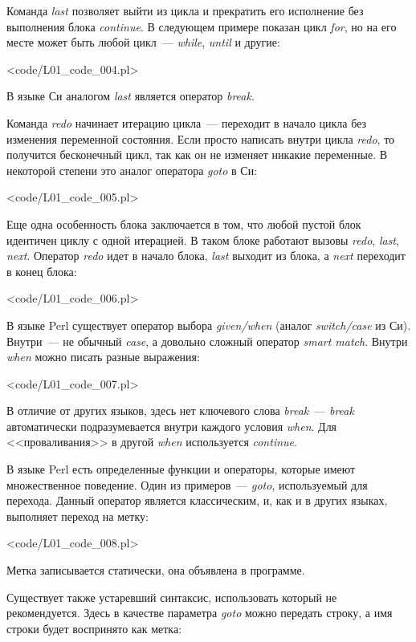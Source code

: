 Команда \textit{last} позволяет выйти из цикла и прекратить его исполнение без выполнения блока \textit{continue}.
В следующем примере показан цикл \textit{for}, но на его месте может быть любой цикл~--- \textit{while}, \textit{until} и другие:

\pr<code/L01_code_004.pl>

В языке Си аналогом \textit{last} является оператор \textit{break}.

Команда \textit{redo} начинает итерацию цикла~--- переходит в начало цикла без изменения переменной состояния.
Если просто написать внутри цикла \textit{redo}, то получится бесконечный цикл, так как он не изменяет никакие переменные.
В некоторой степени это аналог оператора \textit{goto} в Си:

\pr<code/L01_code_005.pl>

Еще одна особенность блока заключается в том, что любой пустой блок идентичен циклу с одной итерацией.
В таком блоке работают вызовы \textit{redo}, \textit{last}, \textit{next}.
Оператор \textit{redo} идет в начало блока, \textit{last} выходит из блока, а \textit{next} переходит в конец блока:

\pr<code/L01_code_006.pl>

В языке Perl существует оператор выбора \textit{given/when} (аналог \textit{switch/case} из Си).
Внутри~--- не обычный \textit{case}, а довольно сложный оператор \textit{smart match}.
Внутри \textit{when} можно писать разные выражения:

\pr<code/L01_code_007.pl>

В отличие от других языков, здесь нет ключевого слова \textit{break}~--- \textit{break} автоматически подразумевается внутри каждого условия \textit{when}.
Для <<проваливания>> в другой \textit{when} используется \textit{continue}.

В языке Perl есть определенные функции и операторы, которые имеют множественное поведение.
Один из примеров~--- \textit{goto}, используемый для перехода.
Данный оператор является классическим, и, как и в других языках, выполняет переход на метку:

\pr<code/L01_code_008.pl>

Метка записывается статически, она объявлена в программе.

Существует также устаревший синтаксис, использовать который не рекомендуется.
Здесь в качестве параметра \textit{goto} можно передать строку, а имя строки будет воспринято как метка:

